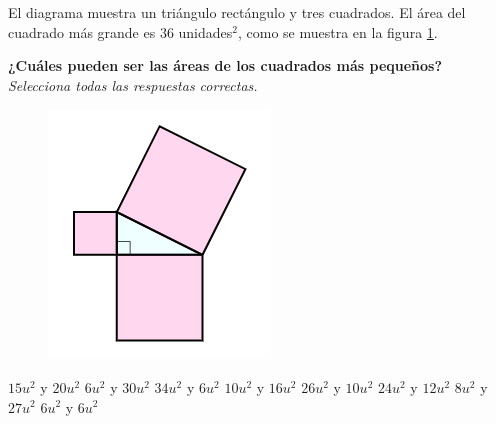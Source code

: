 El diagrama muestra un triángulo rectángulo y tres cuadrados.
El área del cuadrado más grande es 36 unidades$^2$, como se muestra en la figura \ref{fig:area13}.

\textbf{¿Cuáles pueden ser las áreas de los cuadrados más pequeños?}\\
\emph{Selecciona todas las respuestas correctas.}

\begin{multicols}{2}
    \begin{figure}[H]
        \centering
        \includegraphics[width=0.5\linewidth]{../images/area13.png}
        \caption{}
        \label{fig:area13}
    \end{figure}

    \begin{checkboxes}
        \choice $15u^2$ y $20u^2$
        \CorrectChoice $6u^2$ y $30u^2$
        \choice $34u^2$ y $6u^2$
        \choice $10u^2$ y $16u^2$
        \CorrectChoice $26u^2$ y $10u^2$
        \CorrectChoice $24u^2$ y $12u^2$
        \choice $8u^2$ y $27u^2$
        \choice $6u^2$ y $6u^2$
    \end{checkboxes}
\end{multicols}
